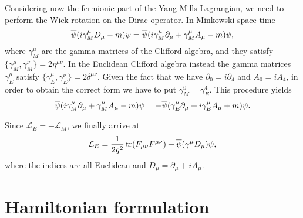 \documentclass{book}
\begin{document}
Considering now the fermionic part of the Yang-Mills Lagrangian, we need to perform the Wick rotation on the Dirac operator.
In Minkowski space-time
\begin{equation}
    \overline{\psi} \qty( i \gamma^{\mu}_M D_{\mu} - m ) \psi
    = \overline{\psi} \qty( i \gamma^{\mu}_M \partial_{\mu} + \gamma^{\mu}_M A_{\mu} - m ) \psi,
\end{equation}
where $\gamma^{\mu}_M$ are the gamma matrices of the Clifford algebra, and they satisfy $\{\gamma^{\mu}_M, \gamma^{\nu}_M\} = 2 \eta^{\mu \nu}$.
In the Euclidean Clifford algebra instead the gamma matrices $\gamma^{\mu}_E$ satisfy $\{\gamma^{\mu}_E, \gamma^{\nu}_E\} = 2 \delta^{\mu \nu}$.
Given the fact that we have $\partial_0 = i \partial_4$ and $A_0 = i A_4$, in order to obtain the correct form we have to put $\gamma^0_M = \gamma^4_E$.
This procedure yields
\begin{equation}
    \overline{\psi} \qty( i \gamma^{\mu}_M \partial_{\mu} + \gamma^{\mu}_M A_{\mu} - m ) \psi
    =
    - \overline{\psi} \qty( \gamma^{\mu}_E \partial_{\mu} + i\gamma^{\mu}_E A_{\mu} + m ) \psi.
\end{equation}

Since $\mathcal{L}_E = - \mathcal{L}_M$, we finally arrive at
\begin{equation}
    \mathcal{L}_E
    = \frac{1}{2 g^2} \tr (F_{\mu \nu} F^{\mu \nu}) + \overline{\psi} \qty( \gamma^{\mu} D_{\mu} ) \psi,
\end{equation}
where the indices are all Euclidean and $D_{\mu} = \partial_{\mu} + i A_{\mu}$.



\section{Hamiltonian formulation}
\label{sec:hamiltonian_formulation}
\end{document}
